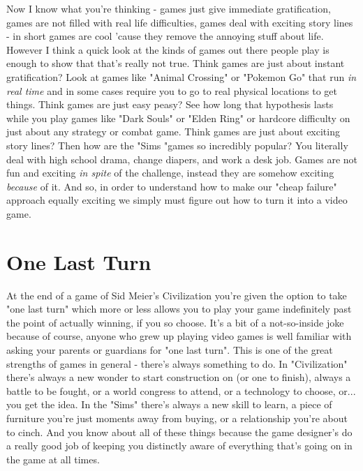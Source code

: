 \documentclass[11pt]{book}
\begin{document}
Now I know what you're thinking - games just give immediate gratification, games are not filled with real life difficulties, games deal with exciting story lines - in short games are cool 'cause they remove the annoying stuff about life. However I think a quick look at the kinds of games out there people play is enough to show that that's really not true. Think games are just about instant gratification? Look at games like "Animal Crossing" or "Pokemon Go" that run \textit{in real time} and in some cases require you to go to real physical locations to get things. Think games are just easy peasy? See how long that hypothesis lasts while you play games like "Dark Souls" or "Elden Ring" or hardcore difficulty on just about any strategy or combat game. Think games are just about exciting story lines? Then how are the "Sims "games so incredibly popular? You literally deal with high school drama, change diapers, and work a desk job. Games are not fun and exciting \textit{in spite} of the challenge, instead they are somehow exciting \textit{because} of it. And so, in order to understand how to make our "cheap failure" approach equally exciting we simply must figure out how to turn it into a video game. 

\section{One Last Turn}
At the end of a game of Sid Meier's Civilization you're given the option to take "one last turn" which more or less allows you to play your game indefinitely past the point of actually winning, if you so choose. It's a bit of a not-so-inside joke because of course, anyone who grew up playing video games is well familiar with asking your parents or guardians for "one last turn". This is one of the great strengths of games in general - there's always something to do. In "Civilization" there's always a new wonder to start construction on (or one to finish), always a battle to be fought, or a world congress to attend, or a technology to choose, or... you get the idea. In the "Sims" there's always a new skill to learn, a piece of furniture you're just moments away from buying, or a relationship you're about to cinch. And you know about all of these things because the game designer's do a really good job of keeping you distinctly aware of everything that's going on in the game at all times. 
\newline
\end{document}
